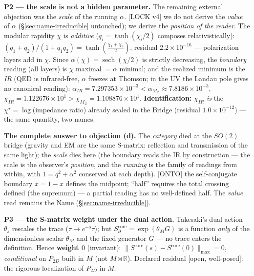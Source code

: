 \documentclass[11pt]{article}
\theoremstyle{definition}\newtheorem{deriv}{Derivation}
\begin{document}
\textbf{P2 --- the scale is not a hidden parameter.} The remaining external objection was the \emph{scale} of the running $\alpha$. \textsf{[LOCK v4]} we do not derive the \emph{value} of $\alpha$ (\S\ref{sec:name-irreducible} untouched); we derive the \emph{position of the reader}. The modular rapidity $\chi$ is \emph{additive} ($q_i=\tanh(\chi_i/2)$ composes relativistically): $(q_1+q_2)/(1+q_1q_2)=\tanh(\tfrac{\chi_1+\chi_2}2)$, residual $2.2\times10^{-16}$ --- polarization layers add in $\chi$. Since $\alpha(\chi)=\operatorname{sech}(\chi/2)$ is strictly decreasing, the \emph{boundary} reading (all layers) is $\chi$ maximal $=\alpha$ minimal; and the realized minimum is the \emph{IR} (QED is infrared-free, $\alpha$ freezes at Thomson; in the UV the Landau pole gives no canonical reading): $\alpha_{IR}=7.297353\times10^{-3}<\alpha_{M_Z}\approx7.8186\times10^{-3}$, $\chi_{IR}=1.122676\times10^{1}>\chi_{M_Z}=1.108876\times10^{1}$. \textbf{Identification:} $\chi_{IR}$ \emph{is} the $\chi^\star=\log$(impedance ratio) already sealed in the Bridge (residual $1.0\times10^{-12}$) --- the same quantity, two names.

\textbf{The complete answer to objection (d).} The \emph{category} died at the $SO(2)$ bridge (gravity and EM are the same S-matrix: reflection and transmission of the same light); the \emph{scale} dies here (the boundary reads the IR by construction --- the scale is the observer's \emph{position}, and the \emph{running} is the family of readings from within, with $1=q^2+\alpha^2$ conserved at each depth). \textsf{[ONTO]} the self-conjugate boundary $x=1-x$ defines the midpoint; ``half'' requires the total crossing defined (the supremum) --- a partial reading has no well-defined half. The \emph{value} read remains the Name (\S\ref{sec:name-irreducible}).

\textbf{P3 --- the S-matrix weight under the dual action.} Takesaki's dual action $\theta_s$ rescales the trace ($\tau\to e^{-s}\tau$); but $S_\partial^{\mathrm{core}}=\exp(\theta_M G)$ is a function \emph{only} of the dimensionless scalar $\theta_M$ and the fixed generator $G$ --- no trace enters the definition. Hence \textbf{weight $0$} (invariant): $\|S^{\mathrm{core}}(s)-S^{\mathrm{core}}(0)\|_{\max}=0$, \emph{conditional} on $P_{2D}$ built in $M$ (not $M\rtimes\mathbb R$). Declared residual [open, well-posed]: the rigorous localization of $P_{2D}$ in $M$.
\end{document}
